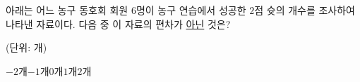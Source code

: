 아래는 어느 농구 동호회 회원 $6$명이 농구 연습에서 성공한 $2$점 슛의 개수를 조사하여 나타낸 자료이다. 다음 중 이 자료의 편차가 \underline{아닌} 것은?\par{\raggedleft\small (단위: 개)\par}
\begin{choices32}{$-2$개}{$-1$개}{$0$개}{$1$개}{$2$개}\end{choices32}

